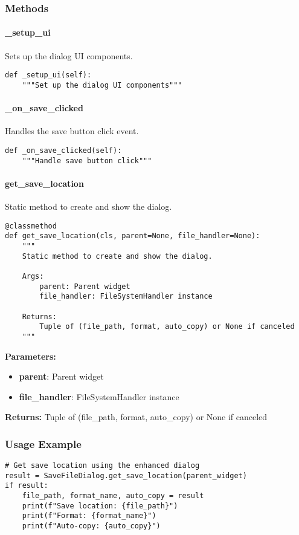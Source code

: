 \subsubsection{Methods}

\paragraph{\_setup\_ui}

Sets up the dialog UI components.

\begin{verbatim}
def _setup_ui(self):
    """Set up the dialog UI components"""
\end{verbatim}

\paragraph{\_on\_save\_clicked}

Handles the save button click event.

\begin{verbatim}
def _on_save_clicked(self):
    """Handle save button click"""
\end{verbatim}

\paragraph{get\_save\_location}

Static method to create and show the dialog.

\begin{verbatim}
@classmethod
def get_save_location(cls, parent=None, file_handler=None):
    """
    Static method to create and show the dialog.
    
    Args:
        parent: Parent widget
        file_handler: FileSystemHandler instance
        
    Returns:
        Tuple of (file_path, format, auto_copy) or None if canceled
    """
\end{verbatim}

\textbf{Parameters:}
\begin{itemize}
    \item \textbf{parent}: Parent widget
    \item \textbf{file\_handler}: FileSystemHandler instance
\end{itemize}

\textbf{Returns:} Tuple of (file\_path, format, auto\_copy) or None if canceled

\subsubsection{Usage Example}

\begin{verbatim}
# Get save location using the enhanced dialog
result = SaveFileDialog.get_save_location(parent_widget)
if result:
    file_path, format_name, auto_copy = result
    print(f"Save location: {file_path}")
    print(f"Format: {format_name}")
    print(f"Auto-copy: {auto_copy}")
\end{verbatim} 